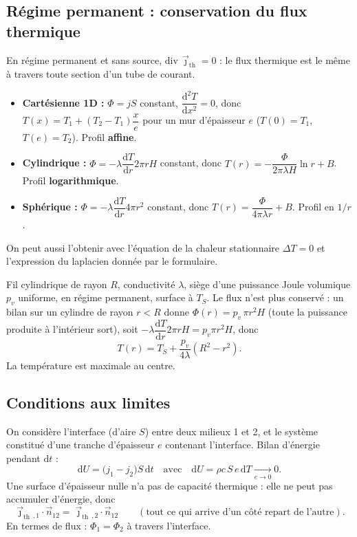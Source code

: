 \documentclass[11pt,a4paper]{article}
\newcommand{\jth}{\vec{\jmath}_{\mathrm{th}}}
\renewcommand{\div}{\mathrm{div}\,}
\newcommand{\dd}{\mathrm{d}}
\begin{document}
\subsection{Régime permanent : conservation du flux thermique}

En régime permanent et sans source, $\div\jth=0$ : le flux thermique est le même à travers
toute section d'un tube de courant.

\begin{demo}[title={Les trois géométries en régime permanent sans source}]
\begin{itemize}[leftmargin=1.5em]
  \item \textbf{Cartésienne 1D :} $\Phi=jS$ constant, $\dfrac{\dd^2T}{\dd x^2}=0$, donc
        $T(x)=T_1+(T_2-T_1)\dfrac{x}{e}$ pour un mur d'épaisseur $e$ ($T(0)=T_1$,
        $T(e)=T_2$). Profil \textbf{affine}.
  \item \textbf{Cylindrique :} $\Phi=-\lambda\dfrac{\dd T}{\dd r}2\pi rH$ constant, donc
        $T(r)=-\dfrac{\Phi}{2\pi\lambda H}\ln r+B$. Profil \textbf{logarithmique}.
  \item \textbf{Sphérique :} $\Phi=-\lambda\dfrac{\dd T}{\dd r}4\pi r^2$ constant, donc
        $T(r)=\dfrac{\Phi}{4\pi\lambda r}+B$. Profil en \textbf{$1/r$}.
\end{itemize}
On peut aussi l'obtenir avec l'équation de la chaleur stationnaire $\Delta T=0$ et
l'expression du laplacien donnée par le formulaire.
\end{demo}

\begin{exemple}[title={Exemple avec source : fil parcouru par un courant}]
Fil cylindrique de rayon $R$, conductivité $\lambda$, siège d'une puissance Joule volumique
$p_v$ uniforme, en régime permanent, surface à $T_S$. Le flux n'est plus conservé :
un bilan sur un cylindre de rayon $r<R$ donne
$\Phi(r)=p_v\,\pi r^2H$ (toute la puissance produite à l'intérieur sort), soit
$-\lambda\dfrac{\dd T}{\dd r}2\pi rH=p_v\pi r^2H$, donc
\[ T(r)=T_S+\dfrac{p_v}{4\lambda}(R^2-r^2). \]
La température est maximale au centre.
\end{exemple}

\subsection{Conditions aux limites}

\begin{demo}[title={Démonstration : continuité du flux thermique à une interface}]
On considère l'interface (d'aire $S$) entre deux milieux 1 et 2, et le système constitué
d'une tranche d'épaisseur $e$ contenant l'interface. Bilan d'énergie pendant $\dd t$ :
\[ \dd U = \big(j_1-j_2\big)S\,\dd t \quad\text{avec}\quad
   \dd U=\rho c\,S\,e\,\dd T\xrightarrow[e\to 0]{}0. \]
Une surface d'épaisseur nulle n'a pas de capacité thermique : elle ne peut pas accumuler
d'énergie, donc
\[ \boxed{\jth{}_{,1}\cdot\vec n_{12}=\jth{}_{,2}\cdot\vec n_{12}}
   \qquad(\text{tout ce qui arrive d'un côté repart de l'autre}). \]
En termes de flux : $\Phi_1=\Phi_2$ à travers l'interface.
\end{demo}
\end{document}
